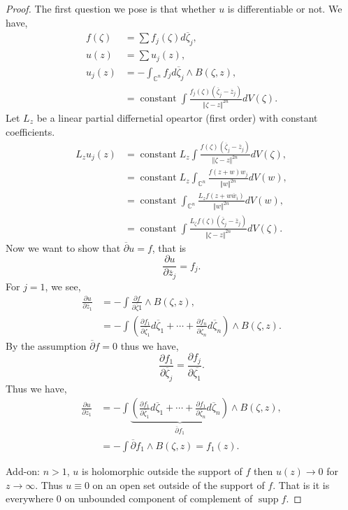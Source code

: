 \documentclass{article}
\DeclareMathOperator{\constant}{constant}
\DeclareMathOperator{\supp}{supp}
\newcommand{\norm}[1]{\Vert #1 \Vert}
\newcommand{\C}[0]{\mathbb{C}}
\newcommand{\pd}[2]{{\frac {\partial#1} {\partial#2}}}
\begin{document}
\begin{proof}
  The first question we pose is that whether $u$ is differentiable or not. We have,
  \begin{align*}
    f(\zeta) & = \sum f_j(\zeta)d\overline{\zeta}_j,\\
    u(z) &= \sum u_j(z),\\
    u_j(z) &= -\int_{\C^n}f_jd\overline{\zeta}_j\wedge B(\zeta,z),\\
    & = \constant \int{\frac {f_j(\zeta)(\overline{\zeta}_j-\overline{z}_j)} {\norm{\zeta-z}^{2n}}}dV(\zeta).
  \end{align*}
  Let $L_z$ be a linear partial differnetial opeartor (first order) with constant coefficients. 
  \begin{align*}
    L_z u_j(z) & = \constant L_z\int {\frac {f(\zeta)(\overline{\zeta}_j-\overline{z}_j)} {\norm{\zeta-z}^{2n}}}dV(\zeta),\\
    & = \constant L_z\int_{\C^n}{\frac {f(z+w)w_j} {\norm{w}^{2n}}}dV(w),\\
    & = \constant \int_{\C^n} {\frac {L_zf(z+w\overline{w}_i)} {\norm{w}^{2n}}}dV(w),\\
    & =  \constant \int {\frac {L_\zeta f(\zeta)(\overline{\zeta}_j-\overline{z}_j)} {\norm{\zeta-z}^{2n}}}dV(\zeta).
  \end{align*}
  Now we want to show that $\overline{\partial}u =f$, that is 
  \begin{equation*}
    \pd{u}{\overline{z}_j} = f_j.
  \end{equation*}
  For $j=1$, we see,
  \begin{align*}
    \pd{u}{\overline{z}_1} &= -\int\pd{f}{\overline{\zeta}1}\wedge B(\zeta,z),\\
    & = -\int \left(\pd{f_1}{\overline{\zeta}_1}d\overline{\zeta}_1 + \cdots +\pd{f_n}{\overline{\zeta}_n}d\overline{\zeta}_n \right)\wedge B(\zeta,z).
  \end{align*}
  By the assumption $\overline{\partial}f = 0$ thus we have,
  \begin{equation*}
    \pd{f_1}{\overline{\zeta}_j} = \pd{f_j}{\overline{\zeta_1}}.
  \end{equation*}
  Thus we have,
  \begin{align*}
    \pd{u}{\overline{z}_1} & = -\int \underbrace{\left(\pd{f_1}{\overline{\zeta}_1}d\overline{\zeta}_1 + \cdots +\pd{f_1}{\overline{\zeta}_n}d\overline{\zeta}_n \right)}_{\overline{\partial}f_1}\wedge B(\zeta,z),\\
    & = -\int\overline{\partial}f_1\wedge B(\zeta,z) = f_1(z).
  \end{align*}
  \par Add-on: $n>1$, $u$ is holomorphic outside the support of $f$ then $u(z)\to0$ for $z\to\infty$. Thus $u\equiv 0$ on an open set outside of the support of $f$. That is it is everywhere $0$ on unbounded component of complement of $\supp f$.
\end{proof}
\end{document}
